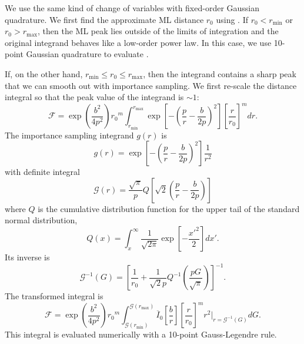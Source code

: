 \documentclass{iopart}
\begin{document}
We use the same kind of change of variables with fixed\nobreakdashes-order Gaussian quadrature. We first find the approximate \ac{ML} distance $r_0$ using . If $r_0 < r_\mathrm{min}$ or $r_0 > r_\mathrm{max}$, then the ML peak lies outside of the limits of integration and the original integrand behaves like a low-order power law. In this case, we use 10\nobreakdashes-point Gaussian quadrature to evaluate .

If, on the other hand, $r_\mathrm{min} \leq r_0 \leq r_\mathrm{max}$, then the integrand contains a sharp peak that we can smooth out with importance sampling. We first re-scale the distance integral  so that the peak value of the integrand is $\sim 1$:
%
\begin{equation}
    \mathscr{F} = \exp\left(\frac{b^2}{4p^2}\right)
        {r_0}^m
        \int_{r_\mathrm{min}}^{r_\mathrm{max}}
        \exp\left[-\left(\frac{p}{r} - \frac{b}{2p}\right)^2\right]
        \left[\frac{r}{r_0}\right]^m
        dr.
\end{equation}
%
The importance sampling integrand $g(r)$ is
%
\begin{equation}
    g(r) = \exp\left[-\left(\frac{p}{r} - \frac{b}{2p}\right)^2\right]
        \frac{1}{r^2}
\end{equation}
%
with definite integral
%
\begin{equation}
    \mathscr{G}(r) = \frac{\sqrt{\pi}}{p}
        Q\left[\sqrt{2}\left(\frac{p}{r} - \frac{b}{2p}\right)\right]
\end{equation}
%
where $Q$ is the cumulative distribution function for the upper tail of the standard normal distribution,
%
\begin{equation}
    Q(x) = \int_x^\infty \frac{1}{\sqrt{2\pi}} \exp \left[-\frac{{x'}^2}{2}\right] dx'.
\end{equation}
%
Its inverse is
%
\begin{equation}
    \mathscr{G}^{-1}(G) = \left[\frac{1}{r_0} + \frac{1}{\sqrt{2}p}
    Q^{-1}\left(\frac{p G}{\sqrt{\pi}}\right)\right]^{-1}.
\end{equation}
%
The transformed integral is
%
\begin{equation}
    \mathscr{F} = \exp\left(\frac{b^2}{4p^2}\right)
        {r_0}^m
        \int_{\mathscr{G}(r_\mathrm{min})}^{\mathscr{G}(r_\mathrm{max})}
        \overline{I}_0\left[\frac{b}{r}\right]
        \left[\frac{r}{r_0}\right]^m r^2
        \Bigg|_{r = \mathscr{G}^{-1}(G)}
        dG.
\end{equation}
%
This integral is evaluated numerically with a 10\nobreakdashes-point Gauss-Legendre rule.
\end{document}
